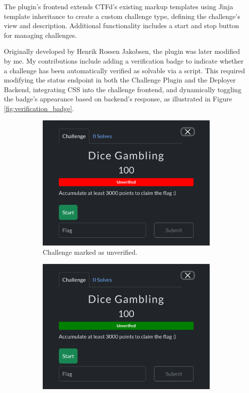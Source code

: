 The plugin's frontend extends CTFd's existing markup templates using Jinja template inheritance to create a custom challenge type, defining the challenge's view and description. Additional functionality includes a start and stop button for managing challenges.

Originally developed by Henrik Rossen Jakobsen, the plugin was later modified by me. My contributions include adding a verification badge to indicate whether a challenge has been automatically verified as solvable via a script. This required modifying the status endpoint in both the Challenge Plugin and the Deployer Backend, integrating CSS into the challenge frontend, and dynamically toggling the badge's appearance based on backend's response, as illustrated in Figure \ref{fig:verification_badge}.

\begin{figure}[h]
    \centering
    \begin{subfigure}[b]{0.45\textwidth}
        \centering
        \includegraphics[width=\textwidth]{images/CTFd_unverified.png}
        \caption{Challenge marked as unverified.}
        \label{fig:unverified_badge}
    \end{subfigure}
    \hfill
    \begin{subfigure}[b]{0.45\textwidth}
        \centering
        \includegraphics[width=\textwidth]{images/CTFd_verified.png}

\end{subfigure}
\end{figure}
